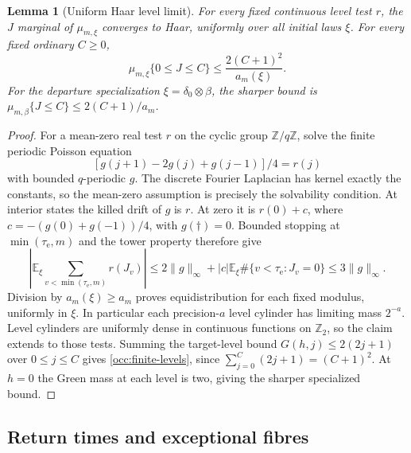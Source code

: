 \documentclass[11pt]{amsart}
\newtheorem{lemma}[theorem]{Lemma}
\theoremstyle{definition}
\theoremstyle{remark}
\newcommand{\Z}{\mathbb Z}
\newcommand{\E}{\mathbb E}
\newcommand{\Ztwo}{\mathbb Z_2}
\begin{document}
\begin{lemma}[Uniform Haar level limit]\label{occ:level-haar}
For every fixed continuous level test $r$, the $J$ marginal of
$\mu_{m,\xi}$ converges to Haar, uniformly over all initial laws $\xi$.
For every fixed ordinary $C\ge0$,
\begin{equation}
 \mu_{m,\xi}\{0\le J\le C\}\le\frac{2(C+1)^2}{a_m(\xi)}.
 \label{occ:finite-levels}
\end{equation}
For the departure specialization $\xi=\delta_0\otimes\beta$, the sharper
bound is $\mu_{m,\beta}\{J\le C\}\le2(C+1)/a_m$.
\end{lemma}
\begin{proof}
For a mean-zero real test $r$ on the cyclic group $\Z/q\Z$, solve the
finite periodic Poisson equation
\[
 [g(j+1)-2g(j)+g(j-1)]/4=r(j)
\]
with bounded $q$-periodic $g$.  The discrete Fourier Laplacian has kernel
exactly the constants, so the mean-zero assumption is precisely the
solvability condition.  At interior states the killed drift of $g$ is
$r$.  At zero it is $r(0)+c$, where
$c=-(g(0)+g(-1))/4$, with $g(\dagger)=0$.  Bounded stopping at
$\min(\tau_{\mathrm e},m)$ and the tower property therefore give
\[
 \left|\E_\xi\sum_{v<\min(\tau_{\mathrm e},m)}r(J_v)\right|
 \le2\|g\|_\infty+|c|\E_\xi\#\{v<\tau_{\mathrm e}:J_v=0\}
 \le3\|g\|_\infty.
\]
Division by $a_m(\xi)\ge a_m$ proves equidistribution for each fixed modulus,
uniformly in $\xi$.  In particular each precision-$a$ level
cylinder has limiting mass $2^{-a}$.  Level cylinders are uniformly dense
in continuous functions on $\Ztwo$, so the claim extends to those tests.
Summing the target-level bound $G(h,j)\le2(2j+1)$ over $0\le j\le C$
gives \eqref{occ:finite-levels}, since $\sum_{j=0}^C(2j+1)=(C+1)^2$.
At $h=0$ the Green mass at each level is two, giving the sharper
specialized bound.
\end{proof}

\subsection{Return times and exceptional fibres}
\label{occ:return-subsection}
\end{document}
